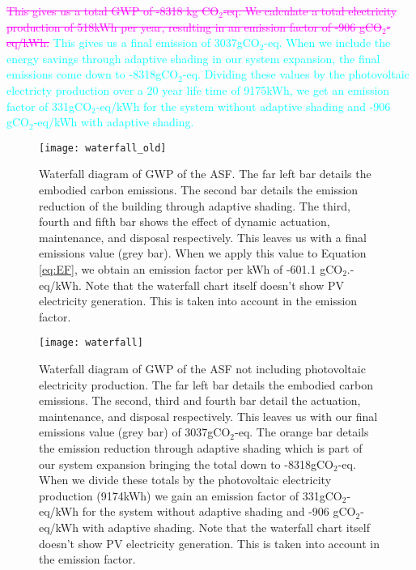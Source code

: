\textcolor{magenta}{\sout{This gives us a total GWP of -8318 kg CO$_{2}$-eq. We calculate a total electricity production of 518kWh per year, resulting in an emission factor of -906 gCO$_{2}$-eq/kWh.}}
\textcolor{cyan}{This gives us a final emission of 3037gCO$_2$-eq. When we include the energy savings through adaptive shading in our system expansion, the final emissions come down to -8318gCO$_2$-eq. Dividing these values by the photovoltaic electricty production over a 20 year life time of 9175kWh, we get an emission factor of 331gCO$_2$-eq/kWh for the system without adaptive shading and -906 gCO$_2$-eq/kWh with adaptive shading.}

\begin{figure}[H]
\begin{center}
\begin{mdframed}[linecolor=magenta, linewidth=2pt]
\texttt{[image: waterfall\_old]}
\caption{Waterfall diagram of GWP of the ASF. The far left bar details the embodied carbon emissions. The second bar details the emission reduction of the building through adaptive shading. The third, fourth and fifth bar shows the effect of dynamic actuation, maintenance, and disposal respectively. This leaves us with a final emissions value (grey bar). When we apply this value to Equation \ref{eq:EF}, we obtain an emission factor per kWh of -601.1 gCO$_2$.-eq/kWh. Note that the waterfall chart itself doesn't show PV electricity generation. This is taken into account in the emission factor.}

\label{fig:waterfallold}
\end{mdframed}
\end{center}
\end{figure}


\begin{figure}[H]
\begin{center}
\begin{mdframed}[linecolor=cyan, linewidth=2pt]
\texttt{[image: waterfall]}
\caption{Waterfall diagram of GWP of the ASF not including photovoltaic electricity production. The far left bar details the embodied carbon emissions. The second, third and fourth bar detail the actuation, maintenance, and disposal respectively. This leaves us with our final emissions value (grey bar) of 3037gCO$_2$-eq. The orange bar details the emission reduction through adaptive shading which is part of our system expansion bringing the total down to -8318gCO$_2$-eq. When we divide these totals by the photovoltaic electricity production (9174kWh) we gain an emission factor of 331gCO$_2$-eq/kWh for the system without adaptive shading and -906 gCO$_2$-eq/kWh with adaptive shading. Note that the waterfall chart itself doesn't show PV electricity generation. This is taken into account in the emission factor.}

\label{fig:waterfall}
\end{mdframed}
\end{center}
\end{figure}

